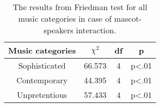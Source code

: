 \begin{table}[H]
    \renewcommand{\arraystretch}{1}
    \begin{center}
        \begin{tabular}{|c|c|c|c|}
            \hline
            \textbf{Music categories} & \textbf{$\chi^2$} & \textbf{df} & \textbf{p} \\
            \hline
            Sophisticated &66.573 &4 &p<.01 \\
            \hline
            Contemporary &44.395 &4 &p<.01\\
            \hline
            Unpretentious &57.433 &4 &p<.01 \\
            \hline
        \end{tabular}
        \caption{The results from Friedman test for all music categories in case of mascot-speakers interaction.}
        \label{table:friedmanMS2}
    \end{center}
\end{table}

